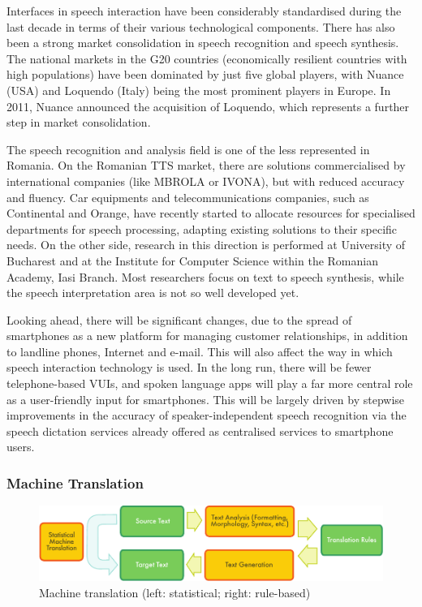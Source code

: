 \begin{multicols}{2}
Interfaces in speech interaction have been considerably standardised during the last decade in terms of their various technological components. There has also been a strong market consolidation in speech recognition and speech synthesis. The national markets in the G20 countries (economically resilient countries with high populations) have been dominated by just five global players, with Nuance (USA) and Loquendo (Italy) being the most prominent players in Europe. In 2011, Nuance announced the acquisition of Loquendo, which represents a further step in market consolidation.

The speech recognition and analysis field is one of the less represented in Romania. On the Romanian TTS market, there are solutions commercialised by international companies (like MBROLA or IVONA), but with reduced accuracy and fluency. Car equipments and telecommunications companies, such as Continental and Orange, have recently started to allocate resources for specialised departments for speech processing, adapting existing solutions to their specific needs. On the other side, research in this direction is performed at University of Bucharest and at the Institute for Computer Science within the Romanian Academy, Iasi Branch. Most researchers focus on text to speech synthesis, while the speech interpretation area is not so well developed yet. 

Looking ahead, there will be significant changes, due to the spread of smartphones as a new platform for managing customer relationships, in addition to landline phones, Internet and e-mail. This will also affect the way in which speech interaction technology is used. In the long run, there will be fewer telephone-based VUIs, and spoken language apps will play a far more central role as a user-friendly input for smartphones. This will be largely driven by stepwise improvements in the accuracy of speaker-independent speech recognition via the speech dictation services already offered as centralised services to smartphone users.

\subsubsection{Machine Translation}

\begin{figure}[htb]
  \center
  \includegraphics[width=\textwidth]{../_media/english/machine_translation}
  \caption{Machine translation (left: statistical; right: rule-based)}
  \label{fig:mtarch_en}
\end{figure}


\end{multicols}

